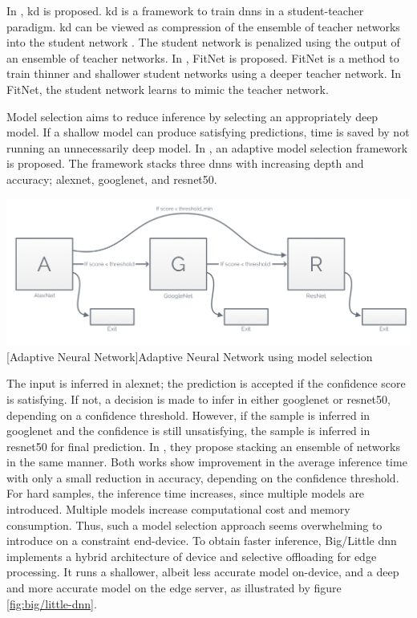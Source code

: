 \begin{enumdescript}
	In \cite{hinton_distilling_2015}, \gls{kd} is proposed. \gls{kd} is a framework to train \gls{dnn}s in a student-teacher paradigm. \gls{kd} can be viewed as compression of the ensemble of teacher networks into the student network \cite{cheng_survey_2017}. The student network is penalized using the output of an ensemble of teacher networks. 
	In \cite{romero_fitnets:_2014}, FitNet is proposed. FitNet is a method to train thinner and shallower student networks using a deeper teacher network. In FitNet, the student network learns to mimic the teacher network.  
	
	\item[Model Selection] Model selection aims to reduce inference by selecting an appropriately deep model. If a shallow model can produce satisfying predictions, time is saved by not running an unnecessarily deep model. In \cite{bolukbasi_adaptive_2017}, an adaptive model selection framework is proposed. The framework stacks three \gls{dnn}s with increasing depth and accuracy; \gls{alexnet}, \gls{googlenet}, and \gls{resnet}50. 
	
	\begin{minipage}[t]{\linewidth}
		\centering                           
		\includegraphics[width=.8\linewidth]{figures/models/adaptive}
		[Adaptive Neural Network]{Adaptive Neural Network using model selection}
	\end{minipage}
	
	The input is inferred in \gls{alexnet}; the prediction is accepted if the confidence score is satisfying. If not, a decision is made to infer in either \gls{googlenet} or \gls{resnet}50, depending on a confidence threshold. However, if the sample is inferred in \gls{googlenet} and the confidence is still unsatisfying, the sample is inferred in \gls{resnet}50 for final prediction. In \cite{tann_flexible_2018}, they propose stacking an ensemble of networks in the same manner. Both works show improvement in the average inference time with only a small reduction in accuracy, depending on the confidence threshold. For hard samples, the inference time increases, since multiple models are introduced. Multiple models increase computational cost and memory consumption. Thus, such a model selection approach seems overwhelming to introduce on a constraint end-device. 	
	To obtain faster inference, Big/Little \gls{dnn} \cite{park_big/little_2015} implements a hybrid architecture of device and selective offloading for edge processing. It runs a shallower, albeit less accurate model on-device, and a deep and more accurate model on the edge server, as illustrated by figure \ref{fig:big/little-dnn}. 
	

\end{enumdescript}
